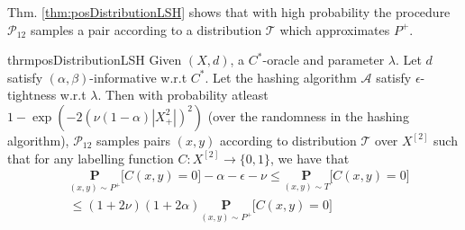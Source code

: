 \documentclass[12pt]{article}
\newcommand{\mb}{\mathbf}
\newcommand{\mc}{\mathcal}
\begin{document}
Thm. \ref{thm:posDistributionLSH} shows that with high probability the procedure $\mc P_{12}$ samples a pair according to a distribution $\mc T$  which approximates $P^+$. 
\begin{restatable}{thrm}{posDistributionLSH}
\label{thm:posDistributionLSH}
Given $(X, d)$, a $C^*$-oracle and parameter $\lambda$. Let $d$ satisfy $(\alpha, \beta)$-informative  w.r.t $C^*$. Let the hashing algorithm $\mc A$ satisfy $\epsilon$-tightness w.r.t $\lambda$. Then with probability atleast $1-\exp(-2(\nu(1-\alpha)|X^2_+|)^2)$ (over the randomness in the hashing algorithm), $\mc P_{12}$ samples pairs $(x, y)$  according to distribution $\mc T$ over $X^{[2]}$ such that for any labelling function $C : X^{[2]} \rightarrow \{0, 1\}$, we have that 
\begin{align*}
  &\underset{(x, y) \sim P^+}{\mb P} \big[ C(x, y) = 0 ] -\alpha -\epsilon -\nu \le \underset{(x, y) \sim T}{\mb P} \big[ C(x, y) = 0 ] \\
  &\le  (1 + 2\nu)(1+2\alpha) \underset{(x, y) \sim P^+}{\mb P} \big[ C(x, y) = 0 ]
\end{align*} 
\end{restatable}
\end{document}
